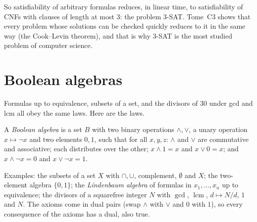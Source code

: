 So satisfiability of arbitrary formulas reduces, in linear time, to satisfiability of CNFs with clauses of length
at most $3$: the problem \textsc{3-SAT}. Tome~C3 shows that every problem whose solutions can be checked quickly reduces
to it in the same way (the Cook--Levin theorem), and that is why \textsc{3-SAT} is the most studied problem of computer
science.

\section{Boolean algebras}\label{sec:boolean}

Formulas up to equivalence, subsets of a set, and the divisors of $30$ under gcd and lcm all obey the same laws. Here are
the laws.

\begin{definition}\label{def:boolalg}
A \emph{Boolean algebra} is a set $B$ with two binary operations $\land,\lor$, a unary operation $x\mapsto\neg x$ and two elements
$0,1$, such that for all $x,y,z$: $\land$ and $\lor$ are commutative and associative; each distributes over the other;
$x\land1=x$ and $x\lor0=x$; and $x\land\neg x=0$ and $x\lor\neg x=1$.
\end{definition}

Examples: the subsets of a set $X$ with $\cap,\cup$, complement, $\emptyset$ and $X$; the two-element algebra $\{0,1\}$; the
\emph{Lindenbaum algebra} of formulas in $x_1,\dots,x_n$ up to equivalence; the divisors of a squarefree integer $N$ with $\gcd$,
$\operatorname{lcm}$, $d\mapsto N/d$, $1$ and $N$. The axioms come in dual pairs (swap $\land$ with $\lor$ and $0$ with $1$), so every consequence of
the axioms has a dual, also true.

